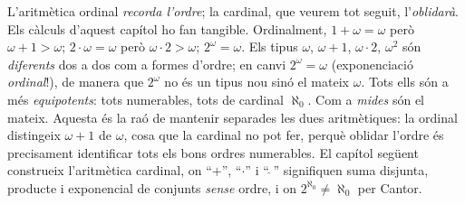 \begin{observacio}\label{obs:ordre-vs-mida}
L'aritmètica ordinal \emph{recorda l'ordre}; la cardinal, que veurem tot
seguit, l'\emph{oblidarà}. Els càlculs d'aquest capítol ho fan tangible.
Ordinalment, \(1+\omega=\omega\) però \(\omega+1>\omega\);
\(2\cdot\omega=\omega\) però \(\omega\cdot2>\omega\); \(2^{\omega}=\omega\).
Els tipus \(\omega\), \(\omega+1\), \(\omega\cdot2\), \(\omega^{2}\) són
\emph{diferents} dos a dos com a formes d'ordre; en canvi \(2^{\omega}=\omega\)
(exponenciació \emph{ordinal}!), de manera que \(2^{\omega}\) no és un tipus
nou sinó el mateix \(\omega\). Tots ells són a més \emph{equipotents}: tots
numerables, tots de cardinal \(\aleph_0\). Com a \emph{mides} són el mateix. Aquesta és la raó de mantenir separades les dues
aritmètiques: la ordinal distingeix \(\omega+1\) de \(\omega\), cosa que la
cardinal no pot fer, perquè oblidar l'ordre és precisament identificar tots
els bons ordres numerables. El capítol següent construeix l'aritmètica
cardinal, on \enquote{\(+\)}, \enquote{\(\cdot\)} i \enquote{\(\,\hat{}\,\)}
signifiquen suma disjunta, producte i exponencial de conjunts \emph{sense}
ordre, i on \(2^{\aleph_0}\neq\aleph_0\) per Cantor.
\end{observacio}

